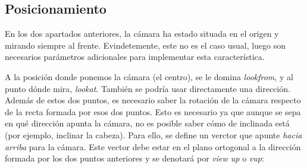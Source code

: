 \documentclass[12pt]{article}
\theoremstyle{definition}
\theoremstyle{remark}
\begin{document}
\subsection{Posicionamiento}

En los dos apartados anteriores, la cámara ha estado situada en el origen y mirando siempre al frente. Evindetemente, este no es el caso usual, luego son necesarios parámetros adicionales para implementar esta característica. 

A la posición donde ponemos la cámara (el centro), se le domina \textit{lookfrom}, y al punto dónde mira, \textit{lookat}. También se podría usar directamente una dirección. Además de estos dos puntos, es necesario saber la rotación de la cámara respecto de la recta formada por esos dos puntos. Esto es necesario ya que aunque se sepa en qué dirección apunta la cámara, no es posible saber cómo de inclinada está (por ejemplo, inclinar la cabeza). Para ello, se define un verctor que apunte \textit{hacia arriba} para la cámara. Este vector debe estar en el plano ortogonal a la dirección formada por los dos puntos anteriores y se denotará por \textit{view up} o \textit{vup}:

\begin{figure}[H]
\centering
{}
\end{figure}
\end{document}

